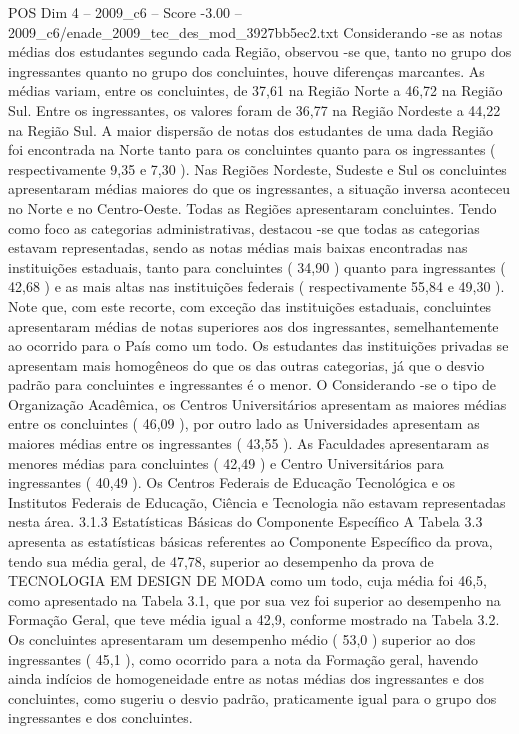 \begin{textsample}{POS Dim 4 – 2009\_c6 – Score -3.00 – 2009\_c6/enade\_2009\_tec\_des\_mod\_3927bb5ec2.txt}
Considerando -se as notas médias dos estudantes segundo cada Região, observou -se que, tanto no grupo dos ingressantes quanto no grupo dos concluintes, houve diferenças marcantes.
As médias variam, entre os concluintes, de 37,61 na Região Norte a 46,72 na Região Sul.
Entre os ingressantes, os valores foram de 36,77 na Região Nordeste a 44,22 na Região Sul.
A maior dispersão de notas dos estudantes de uma dada Região foi encontrada na Norte tanto para os concluintes quanto para os ingressantes ( respectivamente 9,35 e 7,30 ).
Nas Regiões Nordeste, Sudeste e Sul os concluintes apresentaram médias maiores do que os ingressantes, a situação inversa aconteceu no Norte e no Centro-Oeste.
Todas as Regiões apresentaram concluintes.
Tendo como foco as categorias administrativas, destacou -se que todas as categorias estavam representadas, sendo as notas médias mais baixas encontradas nas instituições estaduais, tanto para concluintes ( 34,90 ) quanto para ingressantes ( 42,68 ) e as mais altas nas instituições federais ( respectivamente 55,84 e 49,30 ).
Note que, com este recorte, com exceção das instituições estaduais, concluintes apresentaram médias de notas superiores aos dos ingressantes, semelhantemente ao ocorrido para o País como um todo.
Os estudantes das instituições privadas se apresentam mais homogêneos do que os das outras categorias, já que o desvio padrão para concluintes e ingressantes é o menor.
O Considerando -se o tipo de Organização Acadêmica, os Centros Universitários apresentam as maiores médias entre os concluintes ( 46,09 ), por outro lado as Universidades apresentam as maiores médias entre os ingressantes ( 43,55 ).
As Faculdades apresentaram as menores médias para concluintes ( 42,49 ) e Centro Universitários para ingressantes ( 40,49 ).
Os Centros Federais de Educação Tecnológica e os Institutos Federais de Educação, Ciência e Tecnologia não estavam representadas nesta área. 3.1.3 Estatísticas Básicas do Componente Específico A Tabela 3.3 apresenta as estatísticas básicas referentes ao Componente Específico da prova, tendo sua média geral, de 47,78, superior ao desempenho da prova de TECNOLOGIA EM DESIGN DE MODA como um todo, cuja média foi 46,5, como apresentado na Tabela 3.1, que por sua vez foi superior ao desempenho na Formação Geral, que teve média igual a 42,9, conforme mostrado na Tabela 3.2.
Os concluintes apresentaram um desempenho médio ( 53,0 ) superior ao dos ingressantes ( 45,1 ), como ocorrido para a nota da Formação geral, havendo ainda indícios de homogeneidade entre as notas médias dos ingressantes e dos concluintes, como sugeriu o desvio padrão, praticamente igual para o grupo dos ingressantes e dos concluintes.

\end{textsample}
